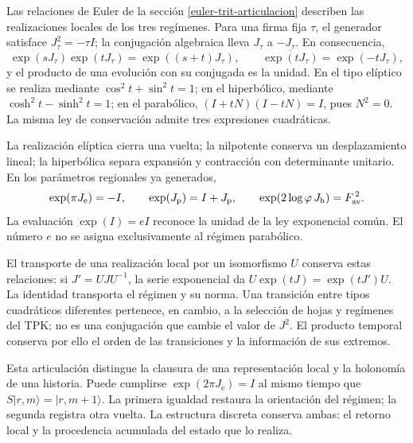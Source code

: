 Las relaciones de Euler de la sección \ref{euler-trit-articulacion}
describen las realizaciones locales de los tres regímenes. Para una firma
fija \(\tau\), el generador satisface \(J_\tau^2=-\tau I\); la
conjugación algebraica lleva \(J_\tau\) a \(-J_\tau\). En consecuencia,
\[
 \exp(sJ_\tau)\exp(tJ_\tau)=\exp((s+t)J_\tau),\qquad
 \overline{\exp(tJ_\tau)}=\exp(-tJ_\tau),
\]
y el producto de una evolución con su conjugada es la unidad. En el tipo
elíptico se realiza mediante \(\cos^2t+\sin^2t=1\); en el hiperbólico,
mediante \(\cosh^2t-\sinh^2t=1\); en el parabólico,
\((I+tN)(I-tN)=I\), pues \(N^2=0\). La misma ley de conservación
admite tres expresiones cuadráticas.

La realización elíptica cierra una vuelta; la nilpotente conserva un
desplazamiento lineal; la hiperbólica separa expansión y contracción con
determinante unitario. En los parámetros regionales ya generados,
\[
 \exp(\pi J_{\mathrm e})=-I,\qquad
 \exp(J_{\mathrm p})=I+J_{\mathrm p},\qquad
 \exp(2\log\varphi\,J_{\mathrm h})=F_{\rm av}^{\,2}.
\]
La evaluación \(\exp(I)=eI\) reconoce la unidad de la ley exponencial
común. El número \(e\) no se asigna exclusivamente al régimen parabólico.

El transporte de una realización local por un isomorfismo \(U\) conserva
estas relaciones: si \(J'=UJU^{-1}\), la serie exponencial da
\(U\exp(tJ)=\exp(tJ')U\). La identidad transporta el régimen y su
norma. Una transición entre tipos cuadráticos diferentes pertenece, en
cambio, a la selección de hojas y regímenes del TPK; no es una conjugación
que cambie el valor de \(J^2\). El producto temporal conserva por ello el
orden de las transiciones y la información de sus extremos.

Esta articulación distingue la clausura de una representación local y la
holonomía de una historia. Puede cumplirse \(\exp(2\pi J_{\mathrm e})=I\)
al mismo tiempo que \(S|r,m\rangle=|r,m+1\rangle\). La primera igualdad
restaura la orientación del régimen; la segunda registra otra vuelta. La
estructura discreta conserva ambas: el retorno local y la procedencia
acumulada del estado que lo realiza.
